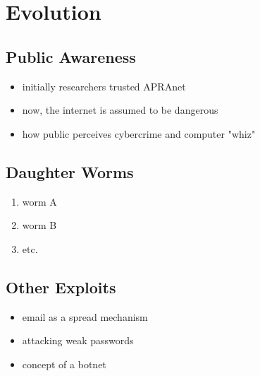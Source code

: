 \section*{Evolution}

\subsection*{Public Awareness}
\begin{itemize}
\item initially researchers trusted APRAnet
\item now, the internet is assumed to be dangerous
\item how public perceives cybercrime and computer "whiz"
\end{itemize} 

\subsection*{Daughter Worms}
\begin{enumerate}
\item worm A
\item worm B
\item etc.
\end{enumerate}
    
\subsection*{Other Exploits}
\begin{itemize}
\item email as a spread mechanism
\item attacking weak passwords
\item concept of a botnet 
\end{itemize} 
